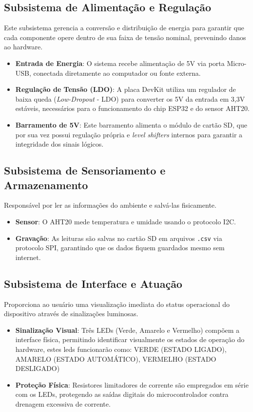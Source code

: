 \subsection{Subsistema de Alimentação e Regulação}
Este subsistema gerencia a conversão e distribuição de energia para garantir que cada componente opere dentro de sua faixa de tensão nominal, prevenindo danos ao hardware.

\begin{itemize}
    \item \textbf{Entrada de Energia}: O sistema recebe alimentação de 5V via porta Micro-USB, conectada diretamente ao computador ou fonte externa.
    \item \textbf{Regulação de Tensão (LDO)}: A placa DevKit utiliza um regulador de baixa queda (\textit{Low-Dropout} - LDO) para converter os 5V da entrada em 3,3V estáveis, necessários para o funcionamento do chip ESP32 e do sensor AHT20.
    \item \textbf{Barramento de 5V}: Este barramento alimenta o módulo de cartão SD, que por sua vez possui regulação própria e \textit{level shifters} internos para garantir a integridade dos sinais lógicos.
\end{itemize}

\subsection{Subsistema de Sensoriamento e Armazenamento}
Responsável por ler as informações do ambiente e salvá-las fisicamente.

\begin{itemize}
    \item \textbf{Sensor}: O AHT20 mede temperatura e umidade usando o protocolo I2C.
    \item \textbf{Gravação}: As leituras são salvas no cartão SD em arquivos \texttt{.csv} via protocolo SPI, garantindo que os dados fiquem guardados mesmo sem internet.
\end{itemize}

\subsection{Subsistema de Interface e Atuação}
Proporciona ao usuário uma visualização imediata do status operacional do dispositivo através de sinalizações luminosas.

\begin{itemize}
    \item \textbf{Sinalização Visual}: Três LEDs (Verde, Amarelo e Vermelho) compõem a interface física, permitindo identificar visualmente os estados de operação do hardware, estes leds funcionarão como: VERDE (ESTADO LIGADO), AMARELO (ESTADO AUTOMÁTICO), VERMELHO (ESTADO DESLIGADO)
    \item \textbf{Proteção Física}: Resistores limitadores de corrente são empregados em série com os LEDs, protegendo as saídas digitais do microcontrolador contra drenagem excessiva de corrente.
\end{itemize}

